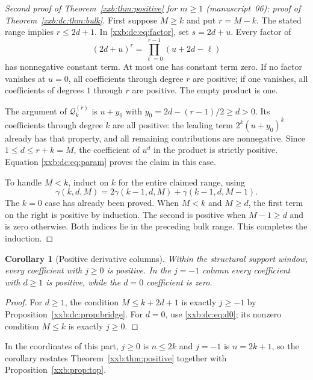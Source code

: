\documentclass[11pt,a4paper]{article}
\numberwithin{equation}{section}
\newtheorem{corollary}[theorem]{Corollary}
\theoremstyle{definition}
\theoremstyle{remark}
\theoremstyle{plain}
\newcommand{\fall}[2]{#1^{\underline{#2}}}
\begin{document}
\begin{proof}[Second proof of Theorem~\ref{xxb:thm:positive} for $m\ge1$
(manuscript~06): proof of Theorem~\ref{xxb:dc:thm:bulk}]
First suppose $M\ge k$ and put $r=M-k$.  The stated range implies
$r\le2d+1$.  In \eqref{xxb:dc:eq:factor}, set $s=2d+u$.  Every factor of
\[
 \fall{(2d+u)}{r}=\prod_{\ell=0}^{r-1}(u+2d-\ell)
\]
has nonnegative constant term.  At most one has constant term zero.  If no
factor vanishes at $u=0$, all coefficients through degree $r$ are positive;
if one vanishes, all coefficients of degrees $1$ through $r$ are positive.
The empty product is one.

The argument of $\mathcal Q_k^{(r)}$ is $u+y_0$ with
$y_0=2d-(r-1)/2\ge d>0$.  Its coefficients through degree $k$ are all
positive: the leading term $2^k(u+y_0)^k$ already has that property, and
all remaining contributions are nonnegative.  Since $1\le d\le r+k=M$,
the coefficient of $u^d$ in the product is strictly positive.  Equation
\eqref{xxb:dc:eq:param} proves the claim in this case.

To handle $M<k$, induct on $k$ for the entire claimed range, using
\begin{equation}\label{xxb:dc:eq:pascalgamma}
 \gamma(k,d,M)=2\gamma(k-1,d,M)+\gamma(k-1,d,M-1).
\end{equation}
The $k=0$ case has already been proved.  When $M<k$ and $M\ge d$, the first
term on the right is positive by induction.  The second is positive when
$M-1\ge d$ and is zero otherwise.  Both indices lie in the preceding bulk
range.  This completes the induction.
\end{proof}

\begin{corollary}[Positive derivative columns]\label{xxb:dc:cor:positivecols}
Within the structural support window, every coefficient with $j\ge0$ is
positive.  In the $j=-1$ column every coefficient with $d\ge1$ is positive,
while the $d=0$ coefficient is zero.
\end{corollary}
\begin{proof}
For $d\ge1$, the condition $M\le k+2d+1$ is exactly $j\ge-1$ by
Proposition~\ref{xxb:dc:prop:bridge}.  For $d=0$, use \eqref{xxb:dc:eq:d0};
its nonzero condition $M\le k$ is exactly $j\ge0$.
\end{proof}

In the coordinates of this part, $j\ge0$ is $n\le2k$ and $j=-1$ is $n=2k+1$,
so the corollary restates Theorem~\ref{xxb:thm:positive} together with
Proposition~\ref{xxb:prop:top}.
\end{document}
